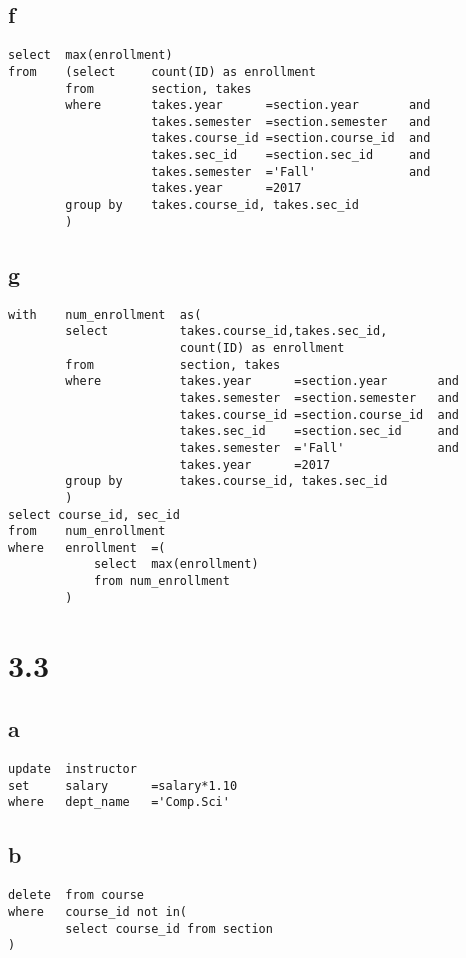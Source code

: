 \documentclass{article}
\begin{document}
    \subsection*{f}
    \begin{verbatim}
select  max(enrollment)
from    (select     count(ID) as enrollment
        from        section, takes
        where       takes.year      =section.year       and
                    takes.semester  =section.semester   and
                    takes.course_id =section.course_id  and
                    takes.sec_id    =section.sec_id     and
                    takes.semester  ='Fall'             and
                    takes.year      =2017
        group by    takes.course_id, takes.sec_id
        )
    \end{verbatim}
    \newpage
    \subsection*{g}
    \begin{verbatim}
with    num_enrollment  as(
        select          takes.course_id,takes.sec_id, 
                        count(ID) as enrollment
        from            section, takes
        where           takes.year      =section.year       and
                        takes.semester  =section.semester   and
                        takes.course_id =section.course_id  and
                        takes.sec_id    =section.sec_id     and
                        takes.semester  ='Fall'             and
                        takes.year      =2017
        group by        takes.course_id, takes.sec_id
        )
select course_id, sec_id
from    num_enrollment
where   enrollment  =(
            select  max(enrollment)
            from num_enrollment
        )
    \end{verbatim}
    \section*{3.3}
    \subsection*{a}
    \begin{verbatim}
update  instructor
set     salary      =salary*1.10
where   dept_name   ='Comp.Sci'
    \end{verbatim}
    \subsection*{b}
    \begin{verbatim}
delete  from course
where   course_id not in(
        select course_id from section
)
    \end{verbatim}
\end{document}

